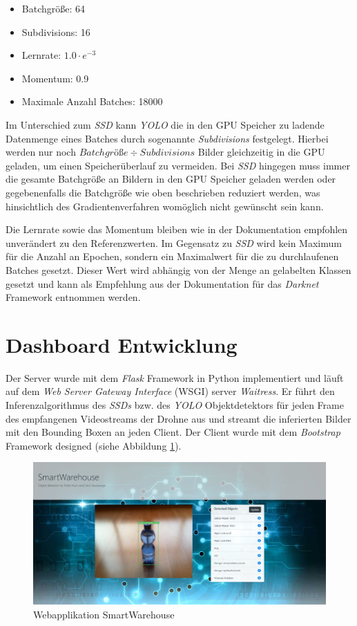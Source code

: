 \begin{itemize}
	\item Batchgröße: 64
	\item Subdivisions: 16
	\item Lernrate: $1.0\cdot e^{-3}$
	\item Momentum: 0.9
	\item Maximale Anzahl Batches: 18000
\end{itemize}

Im Unterschied zum \textit{SSD} kann \textit{YOLO} die in den GPU Speicher zu ladende Datenmenge eines Batches durch sogenannte \textit{Subdivisions} festgelegt. Hierbei werden nur noch \(Batchgröße \div Subdivisions\) Bilder gleichzeitig in die GPU geladen, um einen Speicherüberlauf zu vermeiden. Bei \textit{SSD} hingegen muss immer die gesamte Batchgröße an Bildern in den GPU Speicher geladen werden oder gegebenenfalls die Batchgröße wie oben beschrieben reduziert werden, was hinsichtlich des Gradientenverfahren womöglich nicht gewünscht sein kann.

Die Lernrate sowie das Momentum bleiben wie in der Dokumentation empfohlen unverändert zu den Referenzwerten. Im Gegensatz zu \textit{SSD} wird kein Maximum für die Anzahl an Epochen, sondern ein Maximalwert für die zu durchlaufenen Batches gesetzt. Dieser Wert wird abhängig von der Menge an gelabelten Klassen gesetzt und kann als Empfehlung aus der Dokumentation für das \textit{Darknet} Framework entnommen werden. 

\section{Dashboard Entwicklung}

Der Server wurde mit dem \textit{Flask} Framework in Python implementiert und läuft auf dem \textit{Web Server Gateway Interface} (WSGI) server \textit{Waitress}. Er führt den Inferenzalgorithmus des \textit{SSDs} bzw. des \textit{YOLO} Objektdetektors für jeden Frame des empfangenen Videostreams der Drohne aus und streamt die inferierten Bilder mit den Bounding Boxen an jeden Client. Der Client wurde mit dem \textit{Bootstrap} Framework designed (siehe Abbildung \ref{webapp}).

\begin{figure}[H]
	\begin{center}
		\includegraphics[width=15cm]{Bilder/webapp.jpeg} 
		\caption[Webapplikation SmartWarehouse]{Webapplikation SmartWarehouse}
		\label{webapp}
	\end{center}
\end{figure}


